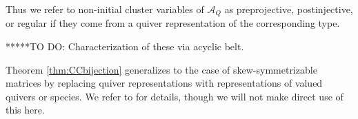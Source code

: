 \documentclass[12pt]{amsart}
\newcommand{\cA}{\mathcal{A}}
\theoremstyle{remark}
\numberwithin{equation}{section}
\numberwithin{figure}{section}
\begin{document}
Thus we refer to non-initial cluster variables of $\cA_Q$ as preprojective, postinjective, or regular if they come from a quiver representation of the corresponding type.

*****TO DO: Characterization of these via acyclic belt.

Theorem \ref{thm:CCbijection} generalizes to the case of skew-symmetrizable matrices by replacing quiver representations with representations of valued quivers or species. We refer to \cite{Ru15} for details, though we will not make direct use of this here. 


\end{document}
